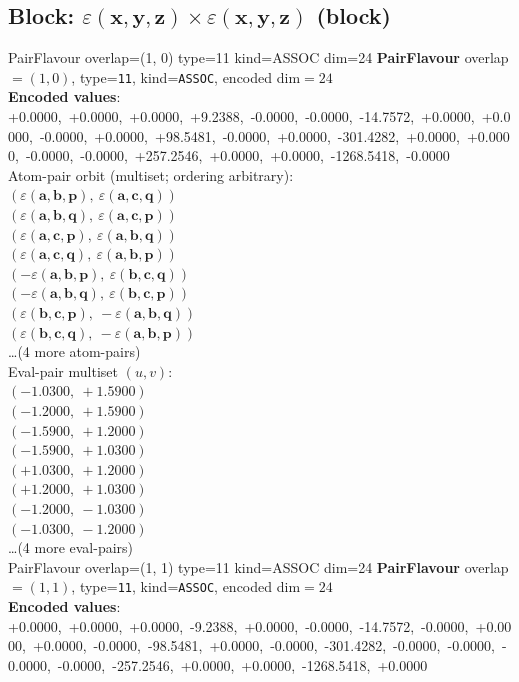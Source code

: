 \documentclass[a4paper,11pt]{article}
\newcommand{\kblbmcpggoncpf}[3]{\varepsilon(\mathbf{#1},\mathbf{#2},\mathbf{#3})}
\begin{document}
\subsection{Block: $\kblbmcpggoncpf{x}{y}{z} \times \kblbmcpggoncpf{x}{y}{z}$  (block)}
    PairFlavour  overlap=(1, 0)  type=11  kind=ASSOC  dim=24
\textbf{PairFlavour} overlap$=(1, 0)$, type=\texttt{11}, kind=\texttt{ASSOC}, encoded dim$=24$\\
\textbf{      Encoded values}: +0.0000,\ +0.0000,\ +0.0000,\ +9.2388,\ -0.0000,\ -0.0000,\ -14.7572,\ +0.0000,\ +0.0000,\ -0.0000,\ +0.0000,\ +98.5481,\ -0.0000,\ +0.0000,\ -301.4282,\ +0.0000,\ +0.0000,\ -0.0000,\ -0.0000,\ +257.2546,\ +0.0000,\ +0.0000,\ -1268.5418,\ -0.0000\\
\quad Atom-pair orbit (multiset; ordering arbitrary):\\
$(\kblbmcpggoncpf{a}{b}{p},\ \kblbmcpggoncpf{a}{c}{q})$\\
$(\kblbmcpggoncpf{a}{b}{q},\ \kblbmcpggoncpf{a}{c}{p})$\\
$(\kblbmcpggoncpf{a}{c}{p},\ \kblbmcpggoncpf{a}{b}{q})$\\
$(\kblbmcpggoncpf{a}{c}{q},\ \kblbmcpggoncpf{a}{b}{p})$\\
$(-\kblbmcpggoncpf{a}{b}{p},\ \kblbmcpggoncpf{b}{c}{q})$\\
$(-\kblbmcpggoncpf{a}{b}{q},\ \kblbmcpggoncpf{b}{c}{p})$\\
$(\kblbmcpggoncpf{b}{c}{p},\ -\kblbmcpggoncpf{a}{b}{q})$\\
$(\kblbmcpggoncpf{b}{c}{q},\ -\kblbmcpggoncpf{a}{b}{p})$\\
\quad \ldots (4 more atom-pairs)\\
\quad Eval-pair multiset $(u, v)$:\\
$(-1.0300,\ +1.5900)$\\
$(-1.2000,\ +1.5900)$\\
$(-1.5900,\ +1.2000)$\\
$(-1.5900,\ +1.0300)$\\
$(+1.0300,\ +1.2000)$\\
$(+1.2000,\ +1.0300)$\\
$(-1.2000,\ -1.0300)$\\
$(-1.0300,\ -1.2000)$\\
\quad \ldots (4 more eval-pairs)\\
    PairFlavour  overlap=(1, 1)  type=11  kind=ASSOC  dim=24
\textbf{PairFlavour} overlap$=(1, 1)$, type=\texttt{11}, kind=\texttt{ASSOC}, encoded dim$=24$\\
\textbf{      Encoded values}: +0.0000,\ +0.0000,\ +0.0000,\ -9.2388,\ +0.0000,\ -0.0000,\ -14.7572,\ -0.0000,\ +0.0000,\ +0.0000,\ -0.0000,\ -98.5481,\ +0.0000,\ -0.0000,\ -301.4282,\ -0.0000,\ -0.0000,\ -0.0000,\ -0.0000,\ -257.2546,\ +0.0000,\ +0.0000,\ -1268.5418,\ +0.0000\\
\end{document}
